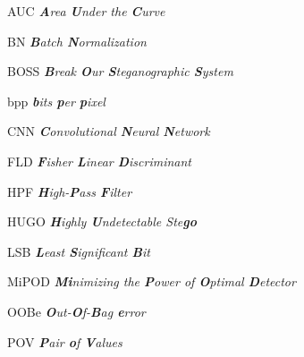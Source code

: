
\listoffigures*
\cleardoublepage


\listoftables*
\cleardoublepage


\begin{siglas}
	\item[AUC] \hspace{9pt}\textit{\textbf{A}rea \textbf{U}nder the \textbf{C}urve}
	\item[BN] \hspace{9pt}\textit{\textbf{B}atch \textbf{N}ormalization}
	\item[BOSS] \hspace{9pt}\textit{\textbf{B}reak \textbf{O}ur \textbf{S}teganographic \textbf{S}ystem}
	\item[bpp] \hspace{9pt}\textit{\textbf{b}its \textbf{p}er \textbf{p}ixel}
	\item[CNN] \hspace{9pt}\textit{\textbf{C}onvolutional \textbf{N}eural \textbf{N}etwork}
	\item[FLD] \hspace{9pt}\textit{\textbf{F}isher \textbf{L}inear \textbf{D}iscriminant}
	\item[HPF] \hspace{9pt}\textit{\textbf{H}igh-\textbf{P}ass \textbf{F}ilter}
	\item[HUGO] \hspace{9pt}\textit{\textbf{H}ighly \textbf{U}ndetectable Ste\textbf{go}}
	\item[LSB] \hspace{9pt}\textit{\textbf{L}east \textbf{S}ignificant \textbf{B}it}
	\item[MiPOD] \hspace{9pt}\textit{\textbf{Mi}nimizing the \textbf{P}ower of \textbf{O}ptimal \textbf{D}etector}
	\item[OOBe] \hspace{9pt}\textit{\textbf{O}ut-\textbf{O}f-\textbf{B}ag \textbf{e}rror}
	\item[POV] \hspace{9pt}\textit{\textbf{P}air \textbf{o}f \textbf{V}alues}

\end{siglas}
